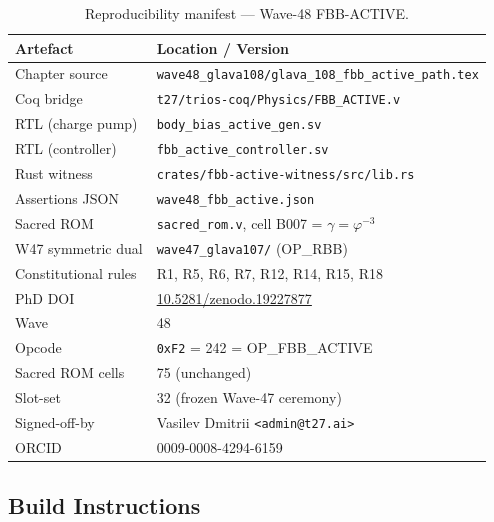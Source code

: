 \documentclass[12pt,a4paper]{report}
\theoremstyle{plain}
\theoremstyle{definition}
\theoremstyle{remark}
\newcommand{\opcode}[1]{\texttt{#1}}
\begin{document}
\begin{table}[h!]
\centering
\caption{Reproducibility manifest — Wave-48 FBB-ACTIVE.}
\label{tab:manifest}
\begin{tabular}{ll}
\toprule
Artefact & Location / Version \\
\midrule
Chapter source & \texttt{wave48\_glava108/glava\_108\_fbb\_active\_path.tex} \\
Coq bridge & \texttt{t27/trios-coq/Physics/FBB\_ACTIVE.v} \\
RTL (charge pump) & \texttt{body\_bias\_active\_gen.sv} \\
RTL (controller) & \texttt{fbb\_active\_controller.sv} \\
Rust witness & \texttt{crates/fbb-active-witness/src/lib.rs} \\
Assertions JSON & \texttt{wave48\_fbb\_active.json} \\
Sacred ROM & \texttt{sacred\_rom.v}, cell B007 = $\gamma = \varphi^{-3}$ \\
W47 symmetric dual & \texttt{wave47\_glava107/} (OP\_RBB) \\
Constitutional rules & R1, R5, R6, R7, R12, R14, R15, R18 \\
PhD DOI & \href{https://doi.org/10.5281/zenodo.19227877}{10.5281/zenodo.19227877} \\
Wave & 48 \\
Opcode & \opcode{0xF2} = 242 = OP\_FBB\_ACTIVE \\
Sacred ROM cells & 75 (unchanged) \\
Slot-set & 32 (frozen Wave-47 ceremony) \\
Signed-off-by & Vasilev Dmitrii \texttt{<admin@t27.ai>} \\
ORCID & 0009-0008-4294-6159 \\
\bottomrule
\end{tabular}
\end{table}

\subsection{Build Instructions}
\end{document}
